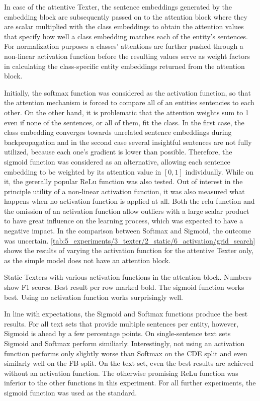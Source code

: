 In case of the attentive Texter, the sentence embeddings generated by the embedding block are subsequently passed on to the attention block where they are scalar multiplied with the class embeddings to obtain the attention values that specify how well a class embedding matches each of the entity's sentences. For normalization purposes a classes' attentions are further pushed through a non-linear activation function before the resulting values serve as weight factors in calculating the class-specific entity embeddings returned from the attention block.

Initially, the softmax function was considered as the activation function, so that the attention mechanism is forced to compare all of an entities sentencies to each other. On the other hand, it is problematic that the attention weights sum to 1 even if none of the sentences, or all of them, fit the class. In the first case, the class embedding converges towards unrelated sentence embeddings during backpropagation and in the second case several insightful sentences are not fully utilized, because each one's gradient is lower than possible. Therefore, the sigmoid function was considered as an alternative, allowing each sentence embedding to be weighted by its attention value in $[0, 1]$ individually. While on it, the gererally popular ReLu function was also tested. Out of interest in the principle utility of a non-linear activation function, it was also measured what happens when no activation function is applied at all. Both the relu function and the omission of an activation function allow outliers with a large scalar product to have great influence on the learning process, which was expected to have a negative impact. In the comparison between Softmax and Sigmoid, the outcome was uncertain. \autoref{tab:5_experiments/3_texter/2_static/6_activation/grid_search} shows the results of varying the activation function for the attentive Texter only, as the simple model does not have an attention block.

\begin{table}[t]
    \centering
    
    \caption{Static Texters with various activation functions in the attention block. Numbers show F1 scores. Best result per row marked bold. The sigmoid function works best. Using no activation function works surprisingly well.}
    \label{tab:5_experiments/3_texter/2_static/6_activation/grid_search}
\end{table}

In line with expectations, the Sigmoid and Softmax functions produce the best results. For all text sets that provide multiple sentences per entity, however, Sigmoid is ahead by a few percentage points. On single-sentence text sets Sigmoid and Softmax perform similiarly. Interestingly, not using an activation function performs only slightly worse than Softmax on the CDE split and even similarly well on the FB split. On the text set, even the best results are achieved without an activation function. The otherwise promising ReLu function was inferior to the other functions in this experiment. For all further experiments, the sigmoid function was used as the standard.
